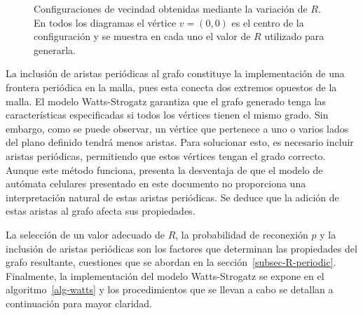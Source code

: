 \begin{figure}[!ht]
\begin{center}
\end{center}\vspace*{-0.6cm}
\caption[Configuraciones de vecindad obtenidas mediante la variaci\'on de $R$]{Configuraciones de vecindad obtenidas mediante la variaci\'on de $R$. En todos los diagramas el v\'ertice $v=(0,0)$ es el centro de la configuraci\'on y se muestra en cada uno el valor de $R$ utilizado para generarla.}
\label{fig-neighbour}
\end{figure}

La inclusi\'on de aristas peri\'odicas al grafo constituye la implementaci\'on de una frontera peri\'odica en la malla, pues esta conecta dos extremos opuestos de la malla. El modelo Watts-Strogatz garantiza que el grafo generado tenga las características especificadas si todos los vértices tienen el mismo grado. Sin embargo, como se puede observar, un vértice que pertenece a uno o varios lados del plano definido tendrá menos aristas. Para solucionar esto, es necesario incluir aristas periódicas, permitiendo que estos vértices tengan el grado correcto. Aunque este método funciona, presenta la desventaja de que el modelo de autómata celulares presentado en este documento no proporciona una interpretación natural de estas aristas periódicas. Se deduce que la adición de estas aristas al grafo afecta sus propiedades.

La selecci\'on de un valor adecuado de $R$, la probabilidad de reconexi\'on $p$ y la inclusi\'on de aristas peri\'odicas son los factores que determinan las propiedades del grafo resultante, cuestiones que se abordan en la secci\'on~\ref{subsec-R-periodic}. Finalmente, la implementaci\'on del modelo Watts-Strogatz se expone en el algoritmo~\ref{alg-watts} y los procedimientos que se llevan a cabo se detallan a continuaci\'on para mayor claridad.

